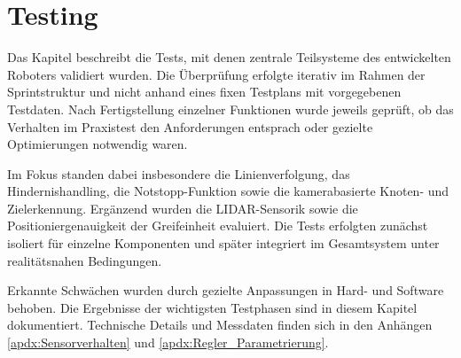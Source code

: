 \documentclass[main.tex]{subfiles} %
\begin{document}

\section{Testing}
Das Kapitel beschreibt die Tests, mit denen zentrale Teilsysteme des entwickelten 
Roboters validiert wurden. Die Überprüfung erfolgte iterativ im Rahmen der 
Sprintstruktur und nicht anhand eines fixen Testplans mit vorgegebenen Testdaten. 
Nach Fertigstellung einzelner Funktionen wurde jeweils geprüft, ob das Verhalten 
im Praxistest den Anforderungen entsprach oder gezielte Optimierungen notwendig waren.

Im Fokus standen dabei insbesondere die Linienverfolgung, das Hindernishandling, 
die Notstopp-Funktion sowie die kamerabasierte Knoten- und Zielerkennung. Ergänzend 
wurden die LIDAR-Sensorik sowie die Positioniergenauigkeit der Greifeinheit evaluiert. 
Die Tests erfolgten zunächst isoliert für einzelne Komponenten und später integriert 
im Gesamtsystem unter realitätsnahen Bedingungen.

Erkannte Schwächen wurden durch gezielte Anpassungen in Hard- und Software behoben. 
Die Ergebnisse der wichtigsten Testphasen sind in diesem Kapitel dokumentiert. 
Technische Details und Messdaten finden sich in den Anhängen \ref{apdx:Sensorverhalten} 
und \ref{apdx:Regler_Parametrierung}.
\end{document}
